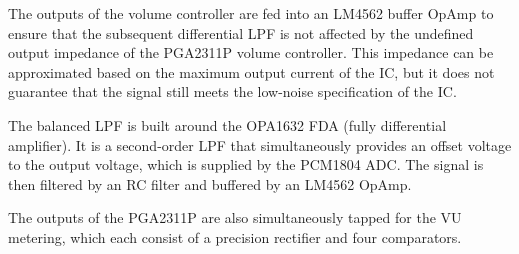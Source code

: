 The outputs of the volume controller are fed into an LM4562 buffer OpAmp to ensure that the subsequent differential LPF is not affected by the undefined output impedance of the PGA2311P volume controller. This impedance can be approximated based on the maximum output current of the IC, but it does not guarantee that the signal still meets the low-noise specification of the IC.

The balanced LPF is built around the OPA1632 FDA (fully differential amplifier). It is a second-order LPF that simultaneously provides an offset voltage to the output voltage, which is supplied by the PCM1804 ADC. The signal is then filtered by an RC filter and buffered by an LM4562 OpAmp.

The outputs of the PGA2311P are also simultaneously tapped for the VU metering, which each consist of a precision rectifier and four comparators.